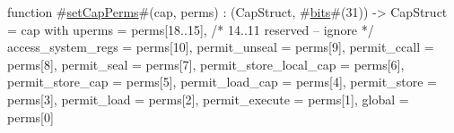 function #\hyperref[zsetCapPerms]{setCapPerms}#(cap, perms) : (CapStruct, #\hyperref[zbits]{bits}#(31)) -> CapStruct =
    { cap with
      uperms                 = perms[18..15],
      /* 14..11 reserved -- ignore */
      access_system_regs     = perms[10],
      permit_unseal          = perms[9],
      permit_ccall           = perms[8],
      permit_seal            = perms[7],
      permit_store_local_cap = perms[6],
      permit_store_cap       = perms[5],
      permit_load_cap        = perms[4],
      permit_store           = perms[3],
      permit_load            = perms[2],
      permit_execute         = perms[1],
      global                 = perms[0]
      }
